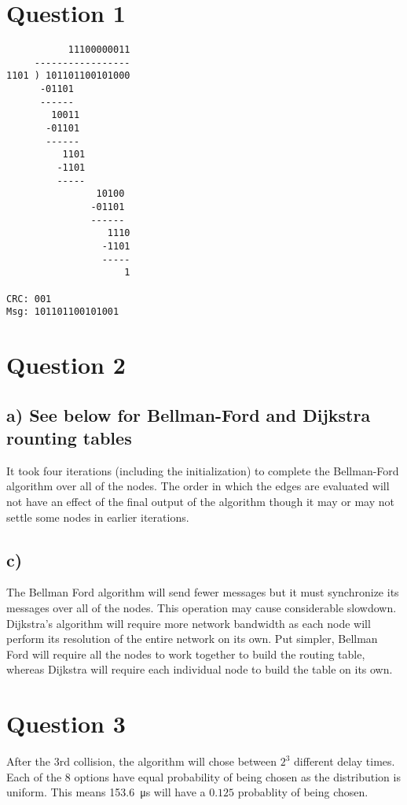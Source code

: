 \documentclass[12pt,letterpaper]{article}
\begin{document}
\section*{Question 1}

\begin{verbatim}
           11100000011
     -----------------
1101 ) 101101100101000
      -01101
      ------
        10011
       -01101
       ------
          1101
         -1101
         -----
                10100
               -01101
               ------
                  1110
                 -1101
                 -----
                     1

CRC: 001
Msg: 101101100101001
\end{verbatim}

\section*{Question 2}

\subsection*{a) See below for Bellman-Ford and Dijkstra rounting tables}
It took four iterations (including the initialization) to complete the Bellman-Ford
algorithm over all of the nodes. The order in which the edges are evaluated will not
have an effect of the final output of the algorithm though it may or may not settle
some nodes in earlier iterations.

\subsection*{c)}
The Bellman Ford algorithm will send fewer messages but it must synchronize its
messages over all of the nodes. This operation may cause considerable slowdown.
Dijkstra's algorithm will require more network bandwidth as each node will perform
its resolution of the entire network on its own. Put simpler, Bellman Ford will
require all the nodes to work together to build the routing table, whereas Dijkstra
will require each individual node to build the table on its own.



\section*{Question 3}
After the 3rd collision, the algorithm will chose between $2^3$ different delay times.
Each of the 8 options have equal probability of being chosen as the distribution is
uniform. This means \SI{153.6}{\micro\s} will have a $0.125$ probablity of being
chosen.
\end{document}
